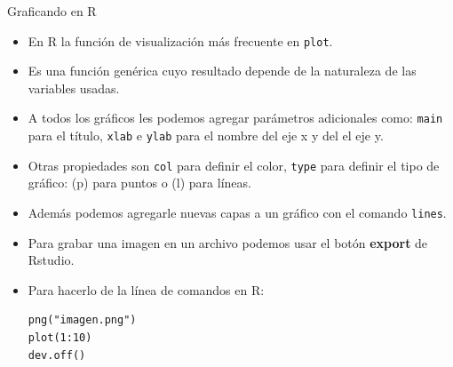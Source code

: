 \documentclass[handout]{beamer}
\begin{document}
\begin{frame}[fragile]{Graficando en R}
\scriptsize{
\begin{itemize}
 \item  En R la función de visualización más frecuente en \verb+plot+. 
 \item Es una función genérica cuyo resultado depende de la naturaleza de las variables usadas. 
 
 \item  A todos los gráficos les podemos agregar parámetros adicionales como: \verb+main+ para el título, \verb+xlab+ e \verb+ylab+  para el nombre del eje x y del el eje y.
 
 \item Otras propiedades son \verb+col+ para definir el color, \verb+type+ para definir el tipo de gráfico: (p) para puntos o (l) para líneas.
 
 \item Además podemos agregarle nuevas capas a un gráfico con el comando \verb+lines+.
 
 \item Para grabar una imagen en un archivo podemos usar el botón \textbf{export} de Rstudio.
 
 \item Para hacerlo de la línea de comandos en R:
 \begin{verbatim}
png("imagen.png")
plot(1:10)
dev.off() 
 \end{verbatim}

 


 
 
\end{itemize}


 
} 
\end{frame}
\end{document}
